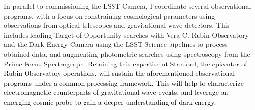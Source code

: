 \documentclass[10pt]{article}
\newcommand{\tcolor}{black}
\begin{document}

In parallel to commissioning the LSST-Camera, I coordinate several observational programs, with a focus on constraining cosmological parameters using observations from optical telescopes and gravitational wave detectors. This includes leading Target-of-Opportunity searches with Vera C. Rubin Observatory and the Dark Energy Camera using the LSST Science pipelines to process obtained data, and augmenting photometric searches using spectroscopy from the Prime Focus Spectrograph. 
\textcolor{\tcolor}{Retaining this expertise at Stanford, the epicenter of Rubin Observatory operations, will sustain the aforementioned observational programs under a common processing framework. This will help to characterize electromagnetic counterparts of gravitational wave events, and leverage an emerging cosmic probe to gain a deeper understanding of dark energy.} 

\end{document}
